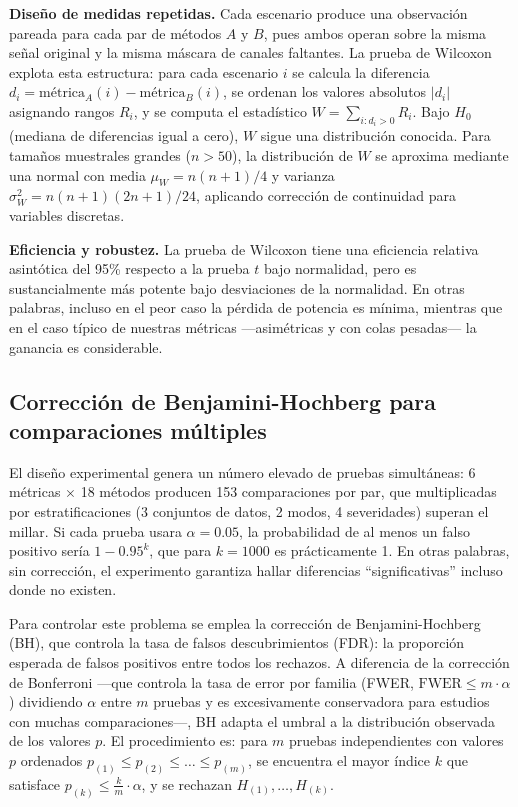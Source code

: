 \textbf{Diseño de medidas repetidas.} Cada escenario produce una observación pareada para cada par de métodos $A$ y $B$, pues ambos operan sobre la misma señal original y la misma máscara de canales faltantes. La prueba de Wilcoxon explota esta estructura: para cada escenario $i$ se calcula la diferencia $d_i = \text{métrica}_A(i) - \text{métrica}_B(i)$, se ordenan los valores absolutos $|d_i|$ asignando rangos $R_i$, y se computa el estadístico $W = \sum_{i: d_i > 0} R_i$. Bajo $H_0$ (mediana de diferencias igual a cero), $W$ sigue una distribución conocida. Para tamaños muestrales grandes ($n > 50$), la distribución de $W$ se aproxima mediante una normal con media $\mu_W = n(n+1)/4$ y varianza $\sigma^2_W = n(n+1)(2n+1)/24$, aplicando corrección de continuidad para variables discretas.

\textbf{Eficiencia y robustez.} La prueba de Wilcoxon tiene una eficiencia relativa asintótica del 95\% respecto a la prueba $t$ bajo normalidad, pero es sustancialmente más potente bajo desviaciones de la normalidad. En otras palabras, incluso en el peor caso la pérdida de potencia es mínima, mientras que en el caso típico de nuestras métricas —asimétricas y con colas pesadas— la ganancia es considerable.

\subsection{Corrección de Benjamini-Hochberg para comparaciones múltiples}

El diseño experimental genera un número elevado de pruebas simultáneas: 6 métricas $\times$ 18 métodos producen 153 comparaciones por par, que multiplicadas por estratificaciones (3 conjuntos de datos, 2 modos, 4 severidades) superan el millar. Si cada prueba usara $\alpha = 0.05$, la probabilidad de al menos un falso positivo sería $1 - 0.95^k$, que para $k = 1000$ es prácticamente 1. En otras palabras, sin corrección, el experimento garantiza hallar diferencias ``significativas'' incluso donde no existen.

Para controlar este problema se emplea la corrección de Benjamini-Hochberg (BH), que controla la tasa de falsos descubrimientos (FDR): la proporción esperada de falsos positivos entre todos los rechazos. A diferencia de la corrección de Bonferroni —que controla la tasa de error por familia (FWER, $\text{FWER} \leq m \cdot \alpha$) dividiendo $\alpha$ entre $m$ pruebas y es excesivamente conservadora para estudios con muchas comparaciones—, BH adapta el umbral a la distribución observada de los valores $p$. El procedimiento es: para $m$ pruebas independientes con valores $p$ ordenados $p_{(1)} \leq p_{(2)} \leq \dots \leq p_{(m)}$, se encuentra el mayor índice $k$ que satisface $p_{(k)} \leq \frac{k}{m} \cdot \alpha$, y se rechazan $H_{(1)}, \dots, H_{(k)}$.

